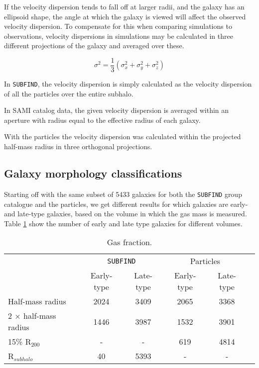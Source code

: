 If the velocity dispersion tends to fall off at larger radii, and the galaxy has an ellipsoid shape, the angle at which the galaxy is viewed will affect the observed velocity dispersion. To compensate for this when comparing simulations to observations, velocity dispersions in simulations may be calculated in three different projections of the galaxy and averaged over these. 

\begin{equation} \label{sigma1}
    \sigma^{2} = \frac{1}{3}(\sigma_x^2 + \sigma_y^2 + \sigma_z^2)
\end{equation}



In \texttt{SUBFIND}, the velocity dispersion is simply calculated as the velocity dispersion of all the particles over the entire subhalo.

In SAMI catalog data, the given velocity dispersion is averaged within an aperture with radius equal to the effective radius of each galaxy.

With the particles the velocity dispersion was calculated within the projected half-mass radius in three orthogonal projections.


\subsection{Galaxy morphology classifications}

Starting off with the same subset of 5433 galaxies for both the \texttt{SUBFIND} group catalogue and the particles, we get different results for which galaxies are early- and late-type galaxies, based on the volume in which the gas mass is measured. Table \ref{gas_frac} show the number of early and late type galaxies for different volumes.



\begin{table}
\begin{center}
\caption{Gas fraction.}
 \label{gas_frac}
\begin{tabular}{ l| c c c c c } 
 \hline
 \hline
   &\multicolumn{2}{c}{\texttt{SUBFIND}}&\multicolumn{2}{c}{Particles} \\
   &  Early-type & Late-type & Early-type & Late-type \\
 \hline
 Half-mass radius & 2024 & 3409 & 2065 & 3368 \\ 
 2 $\times$ half-mass radius & 1446 & 3987 & 1532 & 3901 \\ 
 15\% R$_{200}$ & - & - & 619 & 4814 \\ 
 R$_{subhalo}$ & 40 & 5393 & - & - \\ 
 \hline 
 \end{tabular}
\end{center}
\end{table}

